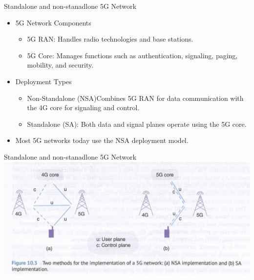 \documentclass{beamer}
\begin{document}
\begin{frame}{Standalone and non-stanadlone 5G Network}
  \vspace*{1.6em}
  \begin{itemize}
    \item 5G Network Components
    \begin{itemize}
        \item 5G RAN: Handles radio technologies and base stations.
        \item 5G Core: Manages functions such as authentication, signaling, paging, mobility, and security.
    \end{itemize}
    \item Deployment Types
    \begin{itemize}
        \item Non-Standalone (NSA)Combines 5G RAN for data communication with the 4G core for signaling and control.
        \item Standalone (SA): Both data and signal planes operate using the 5G core.
    \end{itemize}
    \item Most 5G networks today use the NSA deployment model.
  \end{itemize}
\end{frame}

\begin{frame}{Standalone and non-stanadlone 5G Network}
  \hspace*{0.6em}
  \includegraphics[scale=0.33]{fig/standalone_and_not.png}
\end{frame}
\end{document}

